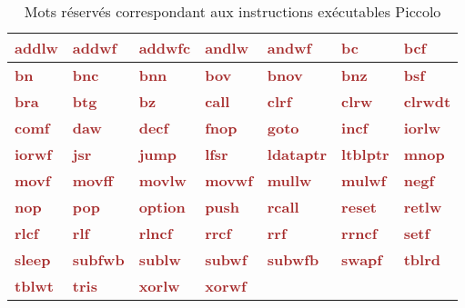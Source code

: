 \newcommand\keyWordInstruction[1]{\textcolor{brown}{\bf#1}}

\begin{table}[!t]
  \centering
\begin{tabular}{|l|l|l|l|l|l|l|}
  \hline
    \keyWordInstruction{addlw} & \keyWordInstruction{addwf} & \keyWordInstruction{addwfc} & \keyWordInstruction{andlw} & \keyWordInstruction{andwf} & \keyWordInstruction{bc} & \keyWordInstruction{bcf} \\
  \hline
    \keyWordInstruction{bn} & \keyWordInstruction{bnc} & \keyWordInstruction{bnn} & \keyWordInstruction{bov} & \keyWordInstruction{bnov} & \keyWordInstruction{bnz} & \keyWordInstruction{bsf} \\
  \hline
    \keyWordInstruction{bra} & \keyWordInstruction{btg} & \keyWordInstruction{bz} & \keyWordInstruction{call} & \keyWordInstruction{clrf} & \keyWordInstruction{clrw} & \keyWordInstruction{clrwdt} \\
  \hline
    \keyWordInstruction{comf} & \keyWordInstruction{daw} & \keyWordInstruction{decf} & \keyWordInstruction{fnop} & \keyWordInstruction{goto} & \keyWordInstruction{incf} & \keyWordInstruction{iorlw} \\
  \hline
    \keyWordInstruction{iorwf} & \keyWordInstruction{jsr} & \keyWordInstruction{jump} & \keyWordInstruction{lfsr} & \keyWordInstruction{ldataptr} & \keyWordInstruction{ltblptr} & \keyWordInstruction{mnop} \\
  \hline
    \keyWordInstruction{movf} & \keyWordInstruction{movff} & \keyWordInstruction{movlw} & \keyWordInstruction{movwf} & \keyWordInstruction{mullw} & \keyWordInstruction{mulwf} & \keyWordInstruction{negf} \\
  \hline
    \keyWordInstruction{nop} & \keyWordInstruction{pop} & \keyWordInstruction{option} & \keyWordInstruction{push} & \keyWordInstruction{rcall} & \keyWordInstruction{reset} & \keyWordInstruction{retlw} \\
  \hline
    \keyWordInstruction{rlcf} & \keyWordInstruction{rlf} & \keyWordInstruction{rlncf} & \keyWordInstruction{rrcf} & \keyWordInstruction{rrf} & \keyWordInstruction{rrncf} & \keyWordInstruction{setf} \\
  \hline
    \keyWordInstruction{sleep} & \keyWordInstruction{subfwb} & \keyWordInstruction{sublw} & \keyWordInstruction{subwf} & \keyWordInstruction{subwfb} & \keyWordInstruction{swapf} & \keyWordInstruction{tblrd}\\
  \hline
    \keyWordInstruction{tblwt} & \keyWordInstruction{tris} & \keyWordInstruction{xorlw} & \keyWordInstruction{xorwf} & & & \\
  \hline
\end{tabular}
  \caption{Mots réservés correspondant aux instructions exécutables Piccolo}
  \ligne
\end{table}




